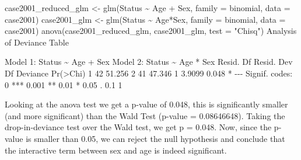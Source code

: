 \documentclass[
]{article}
\newenvironment{Shaded}{\begin{snugshade}}{\end{snugshade}}
\newcommand{\AttributeTok}[1]{\textcolor[rgb]{0.77,0.63,0.00}{#1}}
\newcommand{\DecValTok}[1]{\textcolor[rgb]{0.00,0.00,0.81}{#1}}
\newcommand{\FloatTok}[1]{\textcolor[rgb]{0.00,0.00,0.81}{#1}}
\newcommand{\FunctionTok}[1]{\textcolor[rgb]{0.00,0.00,0.00}{#1}}
\newcommand{\NormalTok}[1]{#1}
\newcommand{\OtherTok}[1]{\textcolor[rgb]{0.56,0.35,0.01}{#1}}
\newcommand{\SpecialCharTok}[1]{\textcolor[rgb]{0.00,0.00,0.00}{#1}}
\newcommand{\StringTok}[1]{\textcolor[rgb]{0.31,0.60,0.02}{#1}}
\begin{document}
\begin{Shaded}
\begin{Highlighting}[]
\NormalTok{case2001\_reduced\_glm }\OtherTok{\textless{}{-}} \FunctionTok{glm}\NormalTok{(Status }\SpecialCharTok{\textasciitilde{}}\NormalTok{ Age }\SpecialCharTok{+}\NormalTok{ Sex, }\AttributeTok{family =}\NormalTok{ binomial, }\AttributeTok{data =}\NormalTok{ case2001)}
\NormalTok{case2001\_glm }\OtherTok{\textless{}{-}} \FunctionTok{glm}\NormalTok{(Status }\SpecialCharTok{\textasciitilde{}}\NormalTok{ Age}\SpecialCharTok{*}\NormalTok{Sex, }\AttributeTok{family =}\NormalTok{ binomial, }\AttributeTok{data =}\NormalTok{ case2001)}
\FunctionTok{anova}\NormalTok{(case2001\_reduced\_glm, case2001\_glm, }\AttributeTok{test =} \StringTok{"Chisq"}\NormalTok{)}
\NormalTok{Analysis of Deviance Table}

\NormalTok{Model }\DecValTok{1}\SpecialCharTok{:}\NormalTok{ Status }\SpecialCharTok{\textasciitilde{}}\NormalTok{ Age }\SpecialCharTok{+}\NormalTok{ Sex}
\NormalTok{Model }\DecValTok{2}\SpecialCharTok{:}\NormalTok{ Status }\SpecialCharTok{\textasciitilde{}}\NormalTok{ Age }\SpecialCharTok{*}\NormalTok{ Sex}
\NormalTok{  Resid. Df Resid. Dev Df Deviance }\FunctionTok{Pr}\NormalTok{(}\SpecialCharTok{\textgreater{}}\NormalTok{Chi)  }
\DecValTok{1}        \DecValTok{42}     \FloatTok{51.256}                       
\DecValTok{2}        \DecValTok{41}     \FloatTok{47.346}  \DecValTok{1}   \FloatTok{3.9099}    \FloatTok{0.048} \SpecialCharTok{*}
\SpecialCharTok{{-}{-}{-}}
\NormalTok{Signif. codes}\SpecialCharTok{:}  \DecValTok{0} \StringTok{\textquotesingle{}***\textquotesingle{}} \FloatTok{0.001} \StringTok{\textquotesingle{}**\textquotesingle{}} \FloatTok{0.01} \StringTok{\textquotesingle{}*\textquotesingle{}} \FloatTok{0.05} \StringTok{\textquotesingle{}.\textquotesingle{}} \FloatTok{0.1} \StringTok{\textquotesingle{} \textquotesingle{}} \DecValTok{1}
\end{Highlighting}
\end{Shaded}

Looking at the anova test we get a p-value of 0.048, this is
significantly smaller (and more significant) than the Wald Test (p-value
= 0.08646648). Taking the drop-in-deviance test over the Wald test, we
get p = 0.048. Now, since the p-value is smaller than 0.05, we can
reject the null hypothesis and conclude that the interactive term
between sex and age is indeed significant.
\end{document}
